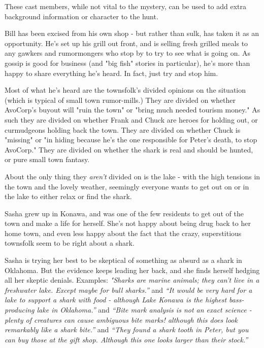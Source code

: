\documentclass{motw}
\begin{document}
These cast members, while not vital to the mystery, can be used to add extra background information or character to the hunt.



Bill has been excised from his own shop - but rather than sulk, has taken it as an opportunity.  He's set up his grill out front, and is selling fresh grilled meals to any gawkers and rumormongers who stop by to try to see what is going on.  As gossip is good for business (and "big fish" stories in particular), he's more than happy to share everything he's heard.  In fact, just try and stop him.

Most of what he's heard are the townsfolk's divided opinions on the situation (which is typical of small town rumor-mills.)  They are divided on whether AvoCorp's buyout will "ruin the town" or "bring much needed tourism money."  As such they are divided on whether Frank and Chuck are heroes for holding out, or curmudgeons holding back the town.  They are divided on whether Chuck is "missing" or "in hiding because he's the one responsible for Peter's death, to stop AvoCorp."  They are divided on whether the shark is real and should be hunted, or pure small town fantasy.

About the only thing they \emph{aren't} divided on is the lake - with the high tensions in the town and the lovely weather, seemingly everyone wants to get out on or in the lake to either relax or find the shark.


Sasha grew up in Konawa, and was one of the few residents to get out of the town and make a life for herself. She’s not happy about being drug back to her home town, and even less happy about the fact that the crazy, superstitious townsfolk seem to be right about a shark.

Sasha is trying her best to be skeptical of something as absurd as a shark in Oklahoma. But the evidence keeps leading her back, and she finds herself hedging all her skeptic denials. Examples: \emph{"Sharks are marine animals; they can't live in a freshwater lake. Except maybe for bull sharks.”} and \emph{“It would be very hard for a lake to support a shark with food - although Lake Konawa is the highest bass-producing lake in Oklahoma.”} and \emph{“Bite mark analysis is not an exact science - plenty of creatures can cause ambiguous bite marks! although this does look remarkably like a shark bite.”} and \emph{“They found a shark tooth in Peter, but you can buy those at the gift shop. Although this one looks larger than their stock.”}
\end{document}
